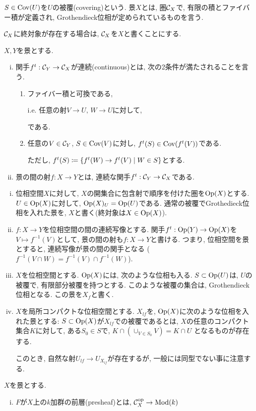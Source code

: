 \documentclass[../main]{subfiles}
\begin{document}
$S\in\mathrm{Cov}(U)$を$U$の被覆(covering)という.
景$X$とは,
圏$\mathcal{C}_X$で,
有限の積とファイバー積が定義され,
Grothendieck位相が定められているものを言う.

$\mathcal{C}_X$に終対象が存在する場合は,
$\mathcal{C}_X$を$X$と書くことにする.

\begin{dfn}
  $X, Y$を景とする.
  \begin{enumerate}[(i)]
    \item 関手$f^t:\mathcal{C}_Y\to\mathcal{C}_X$が連続(continuous)とは,
      次の2条件が満たされることを言う.
      \begin{enumerate}[(1)]
        \item ファイバー積と可換である,

          i.e. 任意の射$V\to U,\,W\to U$に対して,
          である.
        \item 任意の$V\in\mathcal{C}_Y$, $S\in\mathrm{Cov}(V)$に対し,
          $f^t(S)\in\mathrm{Cov}(f^t(V))$である.

          ただし, 
          $f^t(S)\coloneqq
          \left\{
            f^t(W)\to f^t(V)
            \mathrel{}\middle|\mathrel{}
            W\in S
            \right\}$とする.
      \end{enumerate}
    \item 景の間の射$f:X\to Y$とは,
      連続な関手$f^t:\mathcal{C}_Y\to\mathcal{C}_X$である.
  \end{enumerate}
\end{dfn}

\begin{eg}
  \begin{enumerate}[(i)]
    \item 位相空間$X$に対して,
      $X$の開集合に包含射で順序を付けた圏を$\mathrm{Op}(X)$とする.
      $U\in\mathrm{Op}(X)$に対して, $\mathrm{Op}(X)_U = \mathrm{Op}(U)$である.
      通常の被覆でGrothedieck位相を入れた景を,
      $X$と書く(終対象は$X\in\mathrm{Op}(X)$).
    \item $f:X\to Y$を位相空間の間の連続写像とする.
      関手$f^t:\mathrm{Op}(Y)\to\mathrm{Op}(X)$を$V\mapsto f^{-1}(V)$として,
      景の間の射も$f:X\to Y$と書ける.
      つまり, 位相空間を景とすると,
      連続写像が景の間の関手となる
      ($f^{-1}(V\cap W)=f^{-1}(V)\cap f^{-1}(W)$).
    \item $X$を位相空間とする.
      $\mathrm{Op}(X)$には, 次のような位相も入る.
      $S\subset \mathrm{Op}(U)$は,
      $U$の被覆で, 有限部分被覆を持つとする.
      このような被覆の集合は, Grothendieck位相となる.
      この景を$X_f$と書く.
    \item $X$を局所コンパクトな位相空間とする.
      $X_{lf}$を, $\mathrm{Op}(X)$に次のような位相を入れた景とする:
      $S\subset\mathrm{Op}(X)$が$X_{lf}$での被覆であるとは,
      $X$の任意のコンパクト集合$K$に対して,
      ある$S_0\in S$で,
      $K\cap (\cup_{V\in S_0} V) = K\cap U$
      となるものが存在する.

      このとき, 自然な射$U_{lf}\to U_{X_{lf}}$が存在するが,
      一般には同型でない事に注意する.
  \end{enumerate}
\end{eg}

\begin{dfn}
  $X$を景とする.
  \begin{enumerate}[(i)]
    \item $F$が$X$上の$k$加群の前層(presheaf)とは,
      $\mathcal{C}^{\mathrm{op}}_X \to \mathrm{Mod}(k)$
  \end{enumerate}
\end{dfn}
\end{document}
